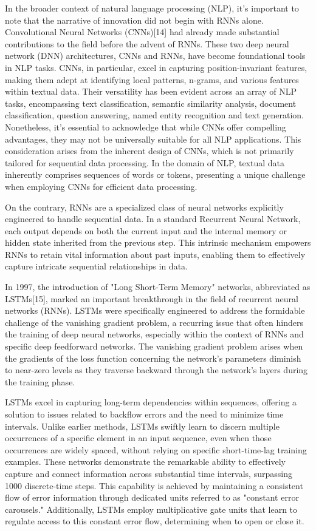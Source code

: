 \documentclass[fleqn,10pt]{thescipub} %
\begin{document}
In the broader context of natural language processing (NLP), it's important to note that the narrative of innovation did not begin with RNNs alone. Convolutional Neural Networks (CNNs)[14] had already made substantial contributions to the field before the advent of RNNs. These two deep neural network (DNN) architectures, CNNs and RNNs, have become foundational tools in NLP tasks. CNNs, in particular, excel in capturing position-invariant features, making them adept at identifying local patterns, n-grams, and various features within textual data. Their versatility has been evident across an array of NLP tasks, encompassing text classification, semantic similarity analysis, document classification, question answering, named entity recognition and text generation. Nonetheless, it's essential to acknowledge that while CNNs offer compelling advantages, they may not be universally suitable for all NLP applications. This consideration arises from the inherent design of CNNs, which is not primarily tailored for sequential data processing. In the domain of NLP, textual data inherently comprises sequences of words or tokens, presenting a unique challenge when employing CNNs for efficient data processing.


On the contrary, RNNs are a specialized class of neural networks explicitly engineered to handle sequential data. In a standard Recurrent Neural Network, each output depends on both the current input and the internal memory or hidden state inherited from the previous step. This intrinsic mechanism empowers RNNs to retain vital information about past inputs, enabling them to effectively capture intricate sequential relationships in data. 




In 1997, the introduction of "Long Short-Term Memory" networks, abbreviated as LSTMs[15], marked an important breakthrough in the field of recurrent neural networks (RNNs). LSTMs were specifically engineered to address the formidable challenge of the vanishing gradient problem, a recurring issue that often hinders the training of deep neural networks, especially within the context of RNNs and specific deep feedforward networks. The vanishing gradient problem arises when the gradients of the loss function concerning the network's parameters diminish to near-zero levels as they traverse backward through the network's layers during the training phase.


LSTMs excel in capturing long-term dependencies within sequences, offering a solution to issues related to backflow errors and the need to minimize time intervals. Unlike earlier methods, LSTMs swiftly learn to discern multiple occurrences of a specific element in an input sequence, even when those occurrences are widely spaced, without relying on specific short-time-lag training examples. These networks demonstrate the remarkable ability to effectively capture and connect information across substantial time intervals, surpassing 1000 discrete-time steps. This capability is achieved by maintaining a consistent flow of error information through dedicated units referred to as "constant error carousels." Additionally, LSTMs employ multiplicative gate units that learn to regulate access to this constant error flow, determining when to open or close it.
\end{document}
